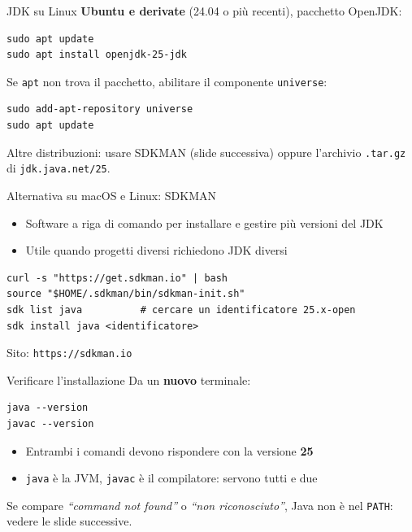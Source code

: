 \documentclass[aspectratio=169,10pt,t]{beamer}
\begin{document}
\begin{frame}[fragile]{JDK su Linux}
  \textbf{Ubuntu e derivate} (24.04 o pi\`u recenti), pacchetto OpenJDK:
\begin{lstlisting}[language={},numbers=none]
sudo apt update
sudo apt install openjdk-25-jdk
\end{lstlisting}
  Se \texttt{apt} non trova il pacchetto, abilitare il componente \texttt{universe}:
\begin{lstlisting}[language={},numbers=none]
sudo add-apt-repository universe
sudo apt update
\end{lstlisting}
  Altre distribuzioni: usare SDKMAN (slide successiva) oppure l'archivio \texttt{.tar.gz} di \texttt{jdk.java.net/25}.
\end{frame}

\begin{frame}[fragile]{Alternativa su macOS e Linux: SDKMAN}
  \begin{itemize}
    \item Software a riga di comando per installare e gestire pi\`u versioni del JDK
    \item Utile quando progetti diversi richiedono JDK diversi
  \end{itemize}
\begin{lstlisting}[language={},numbers=none]
curl -s "https://get.sdkman.io" | bash
source "$HOME/.sdkman/bin/sdkman-init.sh"
sdk list java          # cercare un identificatore 25.x-open
sdk install java <identificatore>
\end{lstlisting}
  Sito: \texttt{https://sdkman.io}
\end{frame}

\begin{frame}[fragile]{Verificare l'installazione}
  Da un \textbf{nuovo} terminale:
\begin{lstlisting}[language={},numbers=none]
java --version
javac --version
\end{lstlisting}
  \begin{itemize}
    \item Entrambi i comandi devono rispondere con la versione \textbf{25}
    \item \texttt{java} \`e la JVM, \texttt{javac} \`e il compilatore: servono tutti e due
  \end{itemize}
  \vspace{0.3em}
  \begin{errore}
    Se compare \emph{``command not found''} o \emph{``non riconosciuto''}, Java non \`e nel \texttt{PATH}: vedere le slide successive.
  \end{errore}
\end{frame}
\end{document}
